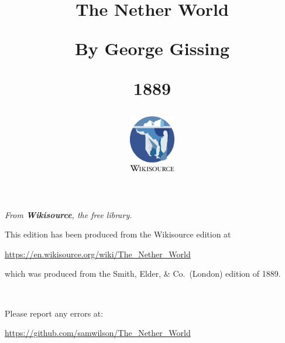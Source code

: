 \documentclass[paper=6in:9in,pagesize=pdftex,headinclude=on,footinclude=on,12pt]{memoir}
\title{
\Huge{The Nether World}

\vspace{2cm}

\LARGE{By George Gissing}

\vspace{1cm}

\large{1889}

\vfill

\includegraphics[width=0.15\textwidth]{Wikisource-logo-fr-en}
}
\date{}
\begin{document}
\maketitle

\clearpage
\begin{vplace}
\begin{center}
\small
\emph{From \textbf{Wikisource}, the free library.}

\vspace{2cm}

This edition has been produced from the Wikisource edition at

\url{https://en.wikisource.org/wiki/The_Nether_World}

which was produced from the Smith, Elder, \& Co.\ (London) edition of 1889.

~

Please report any errors at:

\url{https://github.com/samwilson/The_Nether_World}

\end{center}
\end{vplace}

\clearpage

\frontmatter

\tableofcontents

\mainmatter
\end{document}
